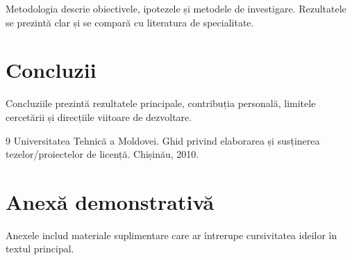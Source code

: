 \documentclass{../utmreport}
\begin{document}
Metodologia descrie obiectivele, ipotezele și metodele de investigare. Rezultatele se prezintă clar și se compară cu literatura de specialitate.

\chapter{Concluzii}

Concluziile prezintă rezultatele principale, contribuția personală, limitele cercetării și direcțiile viitoare de dezvoltare.

\begin{thebibliography}{9}
 Universitatea Tehnică a Moldovei. Ghid privind elaborarea și susținerea tezelor/proiectelor de licență. Chișinău, 2010.
\end{thebibliography}

\appendix
\chapter{Anexă demonstrativă}

Anexele includ materiale suplimentare care ar întrerupe cursivitatea ideilor în textul principal.
\end{document}
